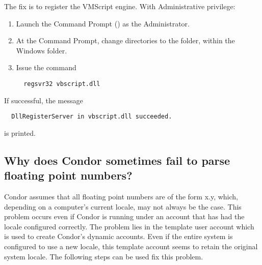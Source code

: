 The fix is to register the VMScript engine.
With Administrative privilege:

\begin{enumerate}
\item Launch the Command Prompt () as the Administrator. 
\item At the Command Prompt, change directories to the  folder, 
within the Windows folder.
\item Issue the command 
\begin{verbatim}
  regsvr32 vbscript.dll
\end{verbatim}
\end{enumerate}

If successful, the message
\begin{verbatim}
  DllRegisterServer in vbscript.dll succeeded.  
\end{verbatim}
is printed.

\subsection*{Why does Condor sometimes fail to parse floating point numbers?}

Condor assumes that all floating point numbers are of the form x.y, which,
depending on a computer's current locale, may not always be the case. This
problem occurs even if Condor is running under an account that has had the
locale configured correctly.  The problem lies in the template user account
which is used to create Condor's dynamic accounts. Even if the entire
system is configured to use a new locale, this template account seems to
retain the original system locale. The following steps can be used fix
this problem.

